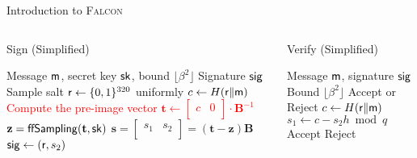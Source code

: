 \begin{frame}{Introduction to \textsc{Falcon}}

\begin{columns}[T]
\begin{block}{{\large Sign (Simplified)}}

\begin{algorithm}[H]
  \label{alg:falcon-sign}
  \begin{algorithmic}[1]
    \REQUIRE Message ${\sf m}$, secret key ${\sf sk}$, bound $\lfloor \beta^2 \rfloor$
    \ENSURE Signature ${\sf sig}$
    \STATE Sample salt ${\sf r} \gets \{0, 1\}^{320}$ uniformly
    \STATE $c \gets H({\sf r} \| {\sf m})$
    \STATE \textcolor<2>{red}{Compute the pre-image vector $\mathbf{t} \gets \left[
\begin{array}{c|c} c & 0 \\ \end{array} \right] \cdot \mathbf{B}^{-1}$}
    \REPEAT
        \STATE $\mathbf{z} = {\sf ffSampling}(\mathbf{t}, {\sf sk})$
        \STATE $\mathbf{s} = \left[ \begin{array}{c|c} s_1 & s_2 \\ \end{array} \right] = (\mathbf{t} - \textbf{z})\mathbf{B}$
    \STATE ${\sf sig} \gets ({\sf r}, s_2)$
  \end{algorithmic}
\end{algorithm}

\end{block}
\begin{block}{{\large Verify (Simplified)}}

\begin{algorithm}[H]
  \label{alg:falcon-verify}
  \begin{algorithmic}[1]
    \REQUIRE Message ${\sf m}$, signature ${\sf sig}$
    \REQUIRE Bound $\lfloor \beta^2 \rfloor$
    \ENSURE Accept or Reject
    \STATE $c \gets H({\sf r} \| {\sf m})$
    \STATE $s_1 \gets c - s_2 h \bmod q$
        \STATE Accept
    \ELSE
        \STATE Reject
    \ENDIF
  \end{algorithmic}
\end{algorithm}

\end{block}
\end{columns}
    
\end{frame}
